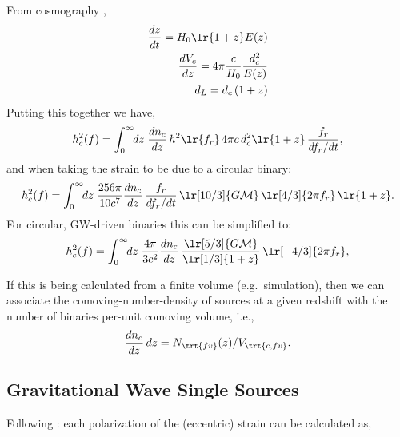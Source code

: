 \documentclass[10pt, oneside, onecolumn]{article}   	%
\begin{document}
            From cosmography \citep[e.g.][]{Hogg1999},
            \begin{subequations}
            \begin{align}
                \frac{dz}{dt} = H_0 \lr{1+z} E(z) \\
                \frac{d V_c}{dz} = 4\pi \frac{c}{H_0} \frac{d_c^2}{E(z)} \\
                d_L = d_c \, (1+z)
            \end{align}
            \end{subequations}
            Putting this together we have,
            \begin{equation}
                h_c^2(f) = \int_0^\infty \!\! dz \; \frac{dn_c}{dz} \, h^2\lr{f_r} \, 4\pi c \, d_c^2 \lr{1+z} \, \frac{f_r}{df_r / dt},
            \end{equation}
            and when taking the strain to be due to a circular binary:
            \begin{equation}
                h_c^2(f) = \int_0^\infty \!\! dz \; \frac{256 \pi}{10 c^7} \frac{dn_c}{dz} \, \frac{f_r}{df_r / dt} \, \lr[10/3]{G \mathcal{M}} \, \lr[4/3]{2\pi f_r} \, \lr{1+z}.
            \end{equation}
            For circular, GW-driven binaries this can be simplified to:
            \begin{equation}
                h_c^2(f) = \int_0^\infty \!\! dz \; \frac{4 \pi}{3 c^2} \frac{dn_c}{dz}  \, \frac{\lr[5/3]{G \mathcal{M}}}{\lr[1/3]{1+z}} \, \lr[-4/3]{2\pi f_r},
            \end{equation}

            If this is being calculated from a finite volume (e.g.~simulation), then we can associate the comoving-number-density of sources at a given redshift with the number of binaries per-unit comoving volume, i.e.,
            \begin{align}
                \frac{dn_c}{dz} \, dz = N_\trt{fv}(z)/V_\trt{c,fv}.
            \end{align}



    \subsection{Gravitational Wave Single Sources}
    \label{sec:gw_singles_calc}

    Following \citet{taylor201505}: each polarization of the (eccentric) strain can be calculated as,
\end{document}

